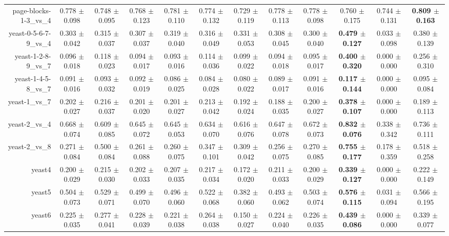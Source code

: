 \begin{table}[!ht]
{\begin{tabular}{r c c c c c c c c c c c}
page-blocks-1-3\_vs\_4 & 0.778 $\pm$ 0.098 & 0.748 $\pm$ 0.095 & 0.768 $\pm$ 0.123 & 0.781 $\pm$ 0.110 & 0.774 $\pm$ 0.132 & 0.729 $\pm$ 0.119 & 0.778 $\pm$ 0.113 & 0.778 $\pm$ 0.098 & 0.760 $\pm$ 0.175 & 0.744 $\pm$ 0.131 & \textbf{0.809 $\pm$ 0.163} \\
yeast-0-5-6-7-9\_vs\_4 & 0.303 $\pm$ 0.042 & 0.315 $\pm$ 0.037 & 0.307 $\pm$ 0.037 & 0.319 $\pm$ 0.040 & 0.316 $\pm$ 0.049 & 0.331 $\pm$ 0.053 & 0.308 $\pm$ 0.045 & 0.300 $\pm$ 0.040 & \textbf{0.479 $\pm$ 0.127} & 0.033 $\pm$ 0.098 & 0.380 $\pm$ 0.139 \\
yeast-1-2-8-9\_vs\_7 & 0.096 $\pm$ 0.018 & 0.118 $\pm$ 0.023 & 0.094 $\pm$ 0.017 & 0.093 $\pm$ 0.016 & 0.114 $\pm$ 0.036 & 0.099 $\pm$ 0.022 & 0.094 $\pm$ 0.018 & 0.095 $\pm$ 0.017 & \textbf{0.400 $\pm$ 0.320} & 0.000 $\pm$ 0.000 & 0.256 $\pm$ 0.310 \\
yeast-1-4-5-8\_vs\_7 & 0.091 $\pm$ 0.016 & 0.093 $\pm$ 0.032 & 0.092 $\pm$ 0.019 & 0.086 $\pm$ 0.025 & 0.084 $\pm$ 0.028 & 0.080 $\pm$ 0.022 & 0.089 $\pm$ 0.017 & 0.091 $\pm$ 0.016 & \textbf{0.117 $\pm$ 0.144} & 0.000 $\pm$ 0.000 & 0.095 $\pm$ 0.084 \\
yeast-1\_vs\_7 & 0.202 $\pm$ 0.027 & 0.216 $\pm$ 0.037 & 0.201 $\pm$ 0.020 & 0.201 $\pm$ 0.027 & 0.213 $\pm$ 0.042 & 0.192 $\pm$ 0.024 & 0.188 $\pm$ 0.035 & 0.200 $\pm$ 0.027 & \textbf{0.378 $\pm$ 0.107} & 0.000 $\pm$ 0.000 & 0.189 $\pm$ 0.113 \\
yeast-2\_vs\_4 & 0.668 $\pm$ 0.074 & 0.609 $\pm$ 0.085 & 0.645 $\pm$ 0.072 & 0.645 $\pm$ 0.053 & 0.634 $\pm$ 0.070 & 0.616 $\pm$ 0.076 & 0.647 $\pm$ 0.078 & 0.672 $\pm$ 0.073 & \textbf{0.832 $\pm$ 0.076} & 0.338 $\pm$ 0.342 & 0.736 $\pm$ 0.111 \\
yeast-2\_vs\_8 & 0.271 $\pm$ 0.084 & 0.500 $\pm$ 0.084 & 0.261 $\pm$ 0.088 & 0.260 $\pm$ 0.075 & 0.347 $\pm$ 0.101 & 0.309 $\pm$ 0.042 & 0.256 $\pm$ 0.075 & 0.270 $\pm$ 0.085 & \textbf{0.755 $\pm$ 0.177} & 0.178 $\pm$ 0.359 & 0.518 $\pm$ 0.258 \\
yeast4 & 0.200 $\pm$ 0.029 & 0.215 $\pm$ 0.030 & 0.202 $\pm$ 0.033 & 0.207 $\pm$ 0.035 & 0.217 $\pm$ 0.034 & 0.172 $\pm$ 0.020 & 0.211 $\pm$ 0.033 & 0.200 $\pm$ 0.029 & \textbf{0.339 $\pm$ 0.127} & 0.000 $\pm$ 0.000 & 0.222 $\pm$ 0.149 \\
yeast5 & 0.504 $\pm$ 0.073 & 0.529 $\pm$ 0.071 & 0.499 $\pm$ 0.070 & 0.496 $\pm$ 0.060 & 0.522 $\pm$ 0.068 & 0.382 $\pm$ 0.060 & 0.493 $\pm$ 0.062 & 0.503 $\pm$ 0.074 & \textbf{0.576 $\pm$ 0.115} & 0.031 $\pm$ 0.094 & 0.566 $\pm$ 0.195 \\
yeast6 & 0.225 $\pm$ 0.035 & 0.277 $\pm$ 0.041 & 0.228 $\pm$ 0.039 & 0.221 $\pm$ 0.038 & 0.264 $\pm$ 0.038 & 0.150 $\pm$ 0.027 & 0.224 $\pm$ 0.040 & 0.226 $\pm$ 0.035 & \textbf{0.439 $\pm$ 0.086} & 0.000 $\pm$ 0.000 & 0.339 $\pm$ 0.077 \\

\end{tabular}}
\end{table}
